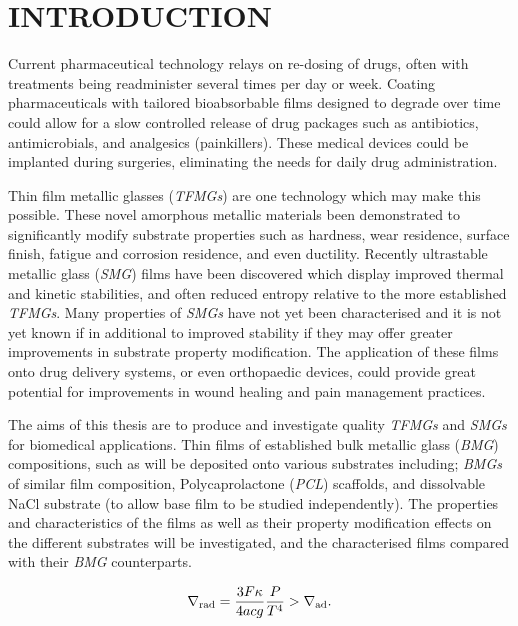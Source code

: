 \section{INTRODUCTION }

Current pharmaceutical technology relays on re-dosing of drugs, often with treatments being readminister several times per day or week. Coating pharmaceuticals with tailored bioabsorbable films designed to degrade over time could allow for a slow controlled release of drug packages such as antibiotics, antimicrobials, and analgesics (painkillers). These medical devices could be implanted during surgeries, eliminating the needs for daily drug administration.  

Thin film metallic glasses (\textit{TFMGs}) are one technology which may make this possible. These novel amorphous metallic materials been demonstrated to significantly modify substrate properties such as hardness, wear residence, surface finish, fatigue and corrosion residence, and even ductility. Recently ultrastable metallic glass (\textit{SMG}) films have been discovered which display improved thermal and kinetic stabilities, and often reduced entropy relative to the more established \textit{TFMGs}. Many properties of \textit{SMGs} have not yet been characterised and it is not yet known if in additional to improved stability if they may offer greater improvements in substrate property modification. The application of these films onto drug delivery systems, or even orthopaedic devices, could provide great potential for improvements in wound healing and pain management practices.

The aims of this thesis are to produce and investigate quality \textit{TFMGs} and \textit{SMGs} for biomedical applications. Thin films of established bulk metallic glass (\textit{BMG}) compositions, such as \MgZnCa will be deposited onto various substrates including; \textit{BMGs} of similar film composition, Polycaprolactone (\textit{PCL}) scaffolds, and dissolvable NaCl substrate (to allow base film to be studied independently). The properties and characteristics of the films as well as their property modification effects on the different substrates will be investigated, and the characterised films compared with their \textit{BMG} counterparts. 

\begin{equation}
\label{eqn:test-equation}
\nabla_{\rm rad} = \frac{3F\kappa}{4acg}\frac{P}{T^4} > \nabla_{\rm ad}.
\end{equation}
